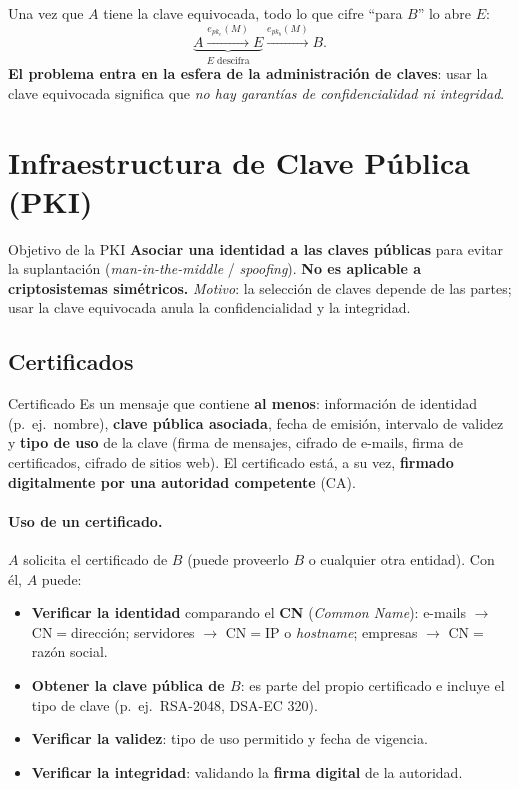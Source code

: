 \documentclass[11pt,a4paper]{article}
\begin{document}
Una vez que $A$ tiene la clave equivocada, todo lo que cifre ``para $B$'' lo abre $E$:
\[
  \underbrace{A \xrightarrow{e_{pk_e}(M)} E}_{\text{$E$ descifra}}
  \xrightarrow{e_{pk_b}(M)} B .
\]
\textbf{El problema entra en la esfera de la administración de claves}: usar la clave
equivocada significa que \emph{no hay garantías de confidencialidad ni integridad}.

\section{Infraestructura de Clave Pública (PKI)}

\begin{defbox}{Objetivo de la PKI}
\textbf{Asociar una identidad a las claves públicas} para evitar la suplantación
(\emph{man-in-the-middle} / \emph{spoofing}). \textbf{No es aplicable a criptosistemas
simétricos.} \emph{Motivo}: la selección de claves depende de las partes; usar la clave
equivocada anula la confidencialidad y la integridad.
\end{defbox}

\subsection{Certificados}

\begin{defbox}{Certificado}
Es un mensaje que contiene \textbf{al menos}: información de identidad (p.\ ej.\ nombre),
\textbf{clave pública asociada}, fecha de emisión, intervalo de validez y \textbf{tipo de uso}
de la clave (firma de mensajes, cifrado de e-mails, firma de certificados, cifrado de sitios
web). El certificado está, a su vez, \textbf{firmado digitalmente por una autoridad
competente} (CA).
\end{defbox}

\paragraph{Uso de un certificado.} $A$ solicita el certificado de $B$ (puede proveerlo $B$ o
cualquier otra entidad). Con él, $A$ puede:
\begin{itemize}[leftmargin=1.4em,itemsep=1pt]
  \item \textbf{Verificar la identidad} comparando el \textbf{CN} (\emph{Common Name}):
        e-mails $\to$ CN${=}$dirección; servidores $\to$ CN${=}$IP o \emph{hostname};
        empresas $\to$ CN${=}$razón social.
  \item \textbf{Obtener la clave pública de $B$}: es parte del propio certificado e incluye el
        tipo de clave (p.\ ej.\ RSA-2048, DSA-EC 320).
  \item \textbf{Verificar la validez}: tipo de uso permitido y fecha de vigencia.
  \item \textbf{Verificar la integridad}: validando la \textbf{firma digital} de la autoridad.
\end{itemize}
\end{document}
